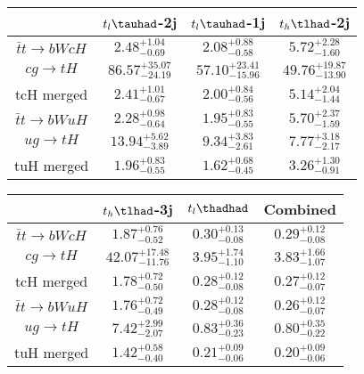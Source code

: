 \centering
\begin{tabular}{|c|c|c|c|} \hline
 & $t_l\tauhad$-2j & $t_l\tauhad$-1j & $t_h\tlhad$-2j\\\hline
$\bar{t}t\to bWcH$ & $2.48^{+1.04}_{-0.69}$ & $2.08^{+0.88}_{-0.58}$ & $5.72^{+2.28}_{-1.60}$\\\hline
$cg\to tH$ & $86.57^{+35.07}_{-24.19}$ & $57.10^{+23.41}_{-15.96}$ & $49.76^{+19.87}_{-13.90}$\\\hline
tcH merged & $2.41^{+1.01}_{-0.67}$ & $2.00^{+0.84}_{-0.56}$ & $5.14^{+2.04}_{-1.44}$\\\hline
$\bar{t}t\to bWuH$ & $2.28^{+0.98}_{-0.64}$ & $1.95^{+0.83}_{-0.55}$ & $5.70^{+2.37}_{-1.59}$\\\hline
$ug\to tH$ & $13.94^{+5.62}_{-3.89}$ & $9.34^{+3.83}_{-2.61}$ & $7.77^{+3.18}_{-2.17}$\\\hline
tuH merged & $1.96^{+0.83}_{-0.55}$ & $1.62^{+0.68}_{-0.45}$ & $3.26^{+1.30}_{-0.91}$\\\hline
\end{tabular}
\begin{tabular}{|c|c|c|c|} \hline
 & $t_h\tlhad$-3j & $t_l\thadhad$ & Combined\\\hline
$\bar{t}t\to bWcH$ & $1.87^{+0.76}_{-0.52}$ & $0.30^{+0.13}_{-0.08}$ & $0.29^{+0.12}_{-0.08}$\\\hline
$cg\to tH$ & $42.07^{+17.48}_{-11.76}$ & $3.95^{+1.74}_{-1.10}$ & $3.83^{+1.66}_{-1.07}$\\\hline
tcH merged & $1.78^{+0.72}_{-0.50}$ & $0.28^{+0.12}_{-0.08}$ & $0.27^{+0.12}_{-0.07}$\\\hline
$\bar{t}t\to bWuH$ & $1.76^{+0.72}_{-0.49}$ & $0.28^{+0.12}_{-0.08}$ & $0.26^{+0.12}_{-0.07}$\\\hline
$ug\to tH$ & $7.42^{+2.99}_{-2.07}$ & $0.83^{+0.36}_{-0.23}$ & $0.80^{+0.35}_{-0.22}$\\\hline
tuH merged & $1.42^{+0.58}_{-0.40}$ & $0.21^{+0.09}_{-0.06}$ & $0.20^{+0.09}_{-0.06}$\\\hline
\end{tabular}
